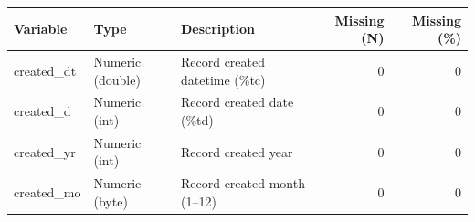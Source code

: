 \begin{threeparttable}


\begin{tabular}{@{}lllrr@{}}


\toprule


\textbf{Variable} & \textbf{Type} & \textbf{Description} & \textbf{Missing (N)} & \textbf{Missing (\%)} \\


\midrule


\midrule
created\_dt & Numeric (double) & Record created datetime (\%tc)&           0&           0\\
created\_d & Numeric (int) & Record created date (\%td)&           0&           0\\
created\_yr & Numeric (int) & Record created year&           0&           0\\
created\_mo & Numeric (byte) & Record created month (1–12)&           0&           0\\
\bottomrule


\end{tabular}


\end{threeparttable}
